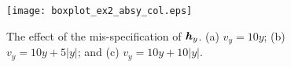 \documentclass[12pt]{article}
\def \bfith{\mbox{\textbf{\textit{h}}}}
\def \bfitV{\mbox{\textbf{\textit{V}}}}
\def \bfitX{\mbox{\textbf{\textit{X}}}}
\begin{document}

\begin{figure}
 \centerline{\texttt{[image: boxplot\_ex2\_absy\_col.eps]}}
\caption{The effect of the mis-specification of $\bfith_y$. (a) $v_y = 10y$; (b) $v_y = 10y + 5|y|$; and (c) $v_y = 10y + 10|y|$.
} \label{fig1}
\end{figure}
\end{document}

